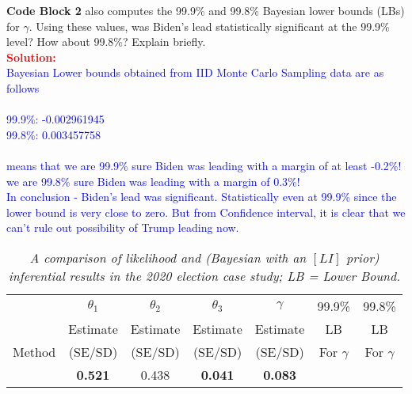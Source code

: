 \documentclass[12pt]{article}
\renewcommand{\b}[1]{\textbf{#1}}
\renewcommand{\i}[1]{\textit{#1}}
\begin{document}
\begin{itemize}
\begin{itemize}
\begin{itemize}
\begin{itemize}
\b{Code Block 2} also computes the 99.9\% and 99.8\% Bayesian lower bounds (LBs) for $\gamma$. Using these values, was Biden's lead statistically significant at the 99.9\% level? How about 99.8\%? Explain briefly. \textit{\fbox{\textbf{[10 points]}}} \\
\textcolor{red}{\textbf{Solution:}} \\
\textcolor{blue}{
Bayesian Lower bounds obtained from IID Monte Carlo Sampling data are as follows
\\ \\
99.9\%: -0.002961945 \\
99.8\%: 0.003457758
\\ \\
means that we are 99.9\% sure Biden was leading with a margin of at least -0.2\%! we are 99.8\% sure Biden was leading with a margin of 0.3\%!
\\
In conclusion - Biden's lead was significant. Statistically even at 99.9\% since the lower bound is very close to zero.
But from Confidence interval, it is clear that we can't rule out possibility of Trump leading
now.
}

\end{itemize}

\begin{table}[t!]

\centering

\caption{\i{A comparison of likelihood and (Bayesian with an $[LI]$ prior) inferential results in the 2020 election case study; LB = Lower Bound.}}

\bigskip

\begin{tabular}{c||c|c|c|c|c|c}

\multicolumn{1}{c}{} & \multicolumn{1}{c}{$\theta_1$} & \multicolumn{1}{c}{$\theta_2$} & \multicolumn{1}{c}{$\theta_3$} & \multicolumn{1}{c}{$\gamma$} & \multicolumn{1}{c}{99.9\%} & 99.8\% \\ \cline{2-5}

\multicolumn{1}{c}{} & Estimate & Estimate & Estimate & \multicolumn{1}{c}{Estimate} & \multicolumn{1}{c}{LB} & LB \\

\multicolumn{1}{c}{Method} & (SE/SD) & (SE/SD) & (SE/SD) & \multicolumn{1}{c}{(SE/SD)} & \multicolumn{1}{c}{For $\gamma$} & For $\gamma$ \\ 

\hline \hline

& \textbf{0.521} & 0.438 & \textbf{0.041} & \textbf{0.083} & \multicolumn{1}{c|}{} \\


\end{tabular}
\end{table}
\end{itemize}
\end{itemize}
\end{itemize}
\end{document}
